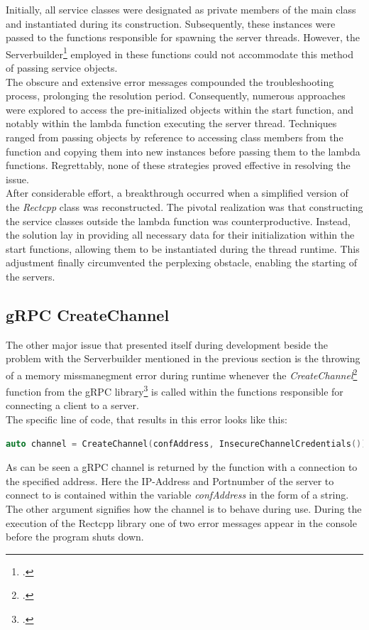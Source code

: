 Initially, all service classes were designated as private members of the main class and instantiated during its construction. Subsequently, these instances were 
passed to the functions responsible for spawning the server threads. However, the Serverbuilder\footcite{grpc_git_serverbuilder} employed in these functions could not accommodate this method of 
passing service objects.\\

The obscure and extensive error messages compounded the troubleshooting process, prolonging the resolution period. Consequently, numerous approaches were explored 
to access the pre-initialized objects within the start function, and notably within the lambda function executing the server thread. Techniques ranged from passing 
objects by reference to accessing class members from the function and copying them into new instances before passing them to the lambda functions. Regrettably, none 
of these strategies proved effective in resolving the issue. \\

After considerable effort, a breakthrough occurred when a simplified version of the \textit{Rectcpp} class was reconstructed. The pivotal realization was that 
constructing the service classes outside the lambda function was counterproductive. Instead, the solution lay in providing all necessary data for their initialization 
within the start functions, allowing them to be instantiated during the thread runtime. This adjustment finally circumvented the perplexing obstacle, enabling the 
starting of the servers.\\

\subsection{gRPC CreateChannel}
The other major issue that presented itself during development beside the problem with the Serverbuilder mentioned in the previous section is the throwing of a 
memory missmanegment error during runtime whenever the \textit{CreateChannel}\footcite{grpc_git_createchannel} function from the gRPC library\footcite{grpc_git_documentation} is called within the functions responsible for 
connecting a client to a server. \\

The specific line of code, that results in this error looks like this:
\begin{lstlisting}[language=C++]
  auto channel = CreateChannel(confAddress, InsecureChannelCredentials());
\end{lstlisting}
As can be seen a gRPC channel is returned by the function with a connection to the specified address. Here the IP-Address and Portnumber of the server to connect to
is contained within the variable \textit{confAddress} in the form of a string. The other argument signifies how the channel is to behave during use. During the execution
of the Rectcpp library one of two error messages appear in the console before the program shuts down. \\


